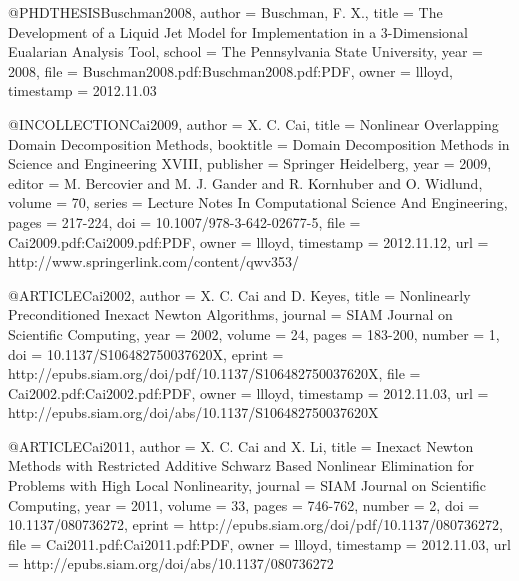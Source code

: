 @PHDTHESIS{Buschman2008,
  author = {Buschman, F. X.},
  title = {The Development of a Liquid Jet Model for Implementation in a 3-Dimensional
	Eualarian Analysis Tool},
  school = {The Pennsylvania State University},
  year = {2008},
  file = {Buschman2008.pdf:Buschman2008.pdf:PDF},
  owner = {llloyd},
  timestamp = {2012.11.03}
}

@INCOLLECTION{Cai2009,
  author = {X. C. Cai},
  title = {Nonlinear Overlapping Domain Decomposition Methods},
  booktitle = {Domain Decomposition Methods in Science and Engineering XVIII},
  publisher = {Springer Heidelberg},
  year = {2009},
  editor = {M. Bercovier and M. J. Gander and R. Kornhuber and O. Widlund},
  volume = {70},
  series = {Lecture Notes In Computational Science And Engineering},
  pages = {217-224},
  doi = {10.1007/978-3-642-02677-5},
  file = {Cai2009.pdf:Cai2009.pdf:PDF},
  owner = {llloyd},
  timestamp = {2012.11.12},
  url = {http://www.springerlink.com/content/qwv353/}
}

@ARTICLE{Cai2002,
  author = {X. C. Cai and D. Keyes},
  title = {Nonlinearly Preconditioned Inexact Newton Algorithms},
  journal = {SIAM Journal on Scientific Computing},
  year = {2002},
  volume = {24},
  pages = {183-200},
  number = {1},
  doi = {10.1137/S106482750037620X},
  eprint = {http://epubs.siam.org/doi/pdf/10.1137/S106482750037620X},
  file = {Cai2002.pdf:Cai2002.pdf:PDF},
  owner = {llloyd},
  timestamp = {2012.11.03},
  url = {http://epubs.siam.org/doi/abs/10.1137/S106482750037620X}
}

@ARTICLE{Cai2011,
  author = {X. C. Cai and X. Li},
  title = {Inexact Newton Methods with Restricted Additive Schwarz Based Nonlinear
	Elimination for Problems with High Local Nonlinearity},
  journal = {SIAM Journal on Scientific Computing},
  year = {2011},
  volume = {33},
  pages = {746-762},
  number = {2},
  doi = {10.1137/080736272},
  eprint = {http://epubs.siam.org/doi/pdf/10.1137/080736272},
  file = {Cai2011.pdf:Cai2011.pdf:PDF},
  owner = {llloyd},
  timestamp = {2012.11.03},
  url = {http://epubs.siam.org/doi/abs/10.1137/080736272}
}

